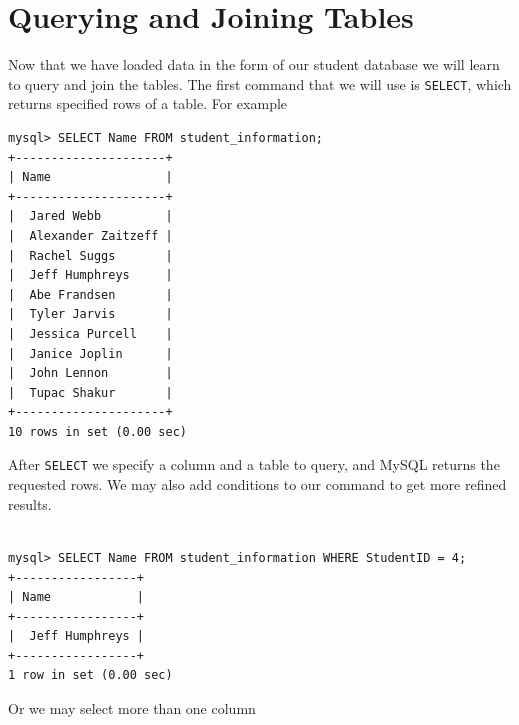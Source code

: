\section{Querying and Joining Tables}
Now that we have loaded data in the form of our student database we will learn to query and join the tables.  The first command that we will use is {\tt SELECT}, which returns specified rows of a table.  For example

\begin{lstlisting}
mysql> SELECT Name FROM student_information;
+---------------------+
| Name                |
+---------------------+
|  Jared Webb         |
|  Alexander Zaitzeff |
|  Rachel Suggs       |
|  Jeff Humphreys     |
|  Abe Frandsen       |
|  Tyler Jarvis       |
|  Jessica Purcell    |
|  Janice Joplin      |
|  John Lennon        |
|  Tupac Shakur       |
+---------------------+
10 rows in set (0.00 sec)
\end{lstlisting}

After {\tt SELECT} we specify a column and a table to query, and MySQL returns the requested rows.  We may also add conditions to our command to get more refined results.

\begin{lstlisting}

mysql> SELECT Name FROM student_information WHERE StudentID = 4;
+-----------------+
| Name            |
+-----------------+
|  Jeff Humphreys |
+-----------------+
1 row in set (0.00 sec)

\end{lstlisting}

Or we may select more than one column

